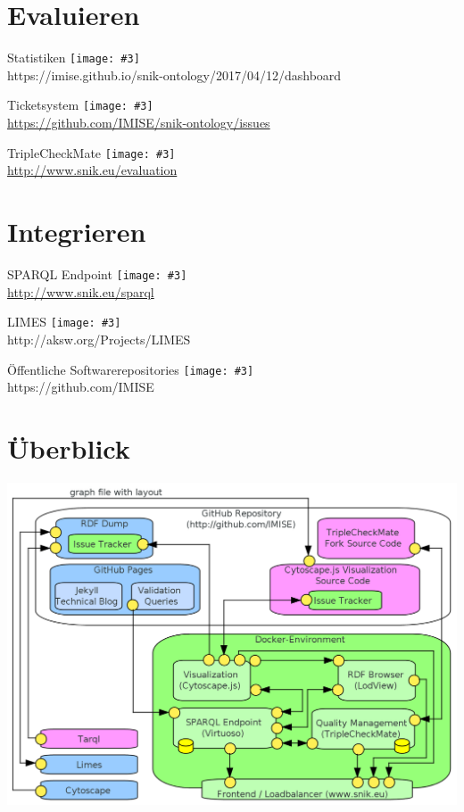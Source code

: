 \documentclass{beamer}
\newcommand{\imageslide}[3][]
{
\begin{frame}{#2}
\centering\texttt{[image: \#3]}
\\#1
\end{frame}
}
\begin{document}
\section{Evaluieren}

\imageslide[https://imise.github.io/snik-ontology/2017/04/12/dashboard]{Statistiken}{../sniktec/img/dashboard-medley.png}
\imageslide[\url{https://github.com/IMISE/snik-ontology/issues}]{Ticketsystem}{../sniktec/img/gitissue.png}
\imageslide[\url{http://www.snik.eu/evaluation}]{TripleCheckMate}{../sniktec/img/triplecheckmate.png}

\section{Integrieren}

\imageslide[\url{http://www.snik.eu/sparql}]{SPARQL Endpoint}{../sniktec/img/sparqlresult.png}

\imageslide[http://aksw.org/Projects/LIMES]{LIMES}{../sniktec/img/limes.png}

\imageslide[https://github.com/IMISE]{Öffentliche Softwarerepositories}{../sniktec/img/github.png}

\section{Überblick}

\begin{frame}
\includegraphics[width=\textwidth]{../sniktec/img/architecture.png}
\end{frame}
\end{document}
